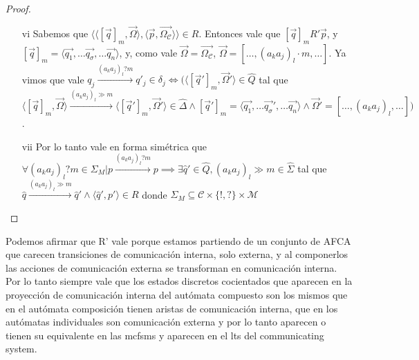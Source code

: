 \begin{proof}
\begin{itemize}
    \item[vi]  Sabemos que $\langle \langle [\overrightarrow{q}]_m, \overrightarrow{\Omega} \rangle, \langle \overrightarrow{p}, \overrightarrow{\Omega_\mathcal{C}} \rangle \rangle \in R$. Entonces vale que $[\overrightarrow{q}]_mR'\overrightarrow{p}$, y $[\overrightarrow{q}]_m = \langle \overrightarrow{q_1}, \ldots \overrightarrow{q_\sigma}, \ldots \overrightarrow{q_n} \rangle$, y, como vale $\overrightarrow{\Omega}=\overrightarrow{\Omega_\mathcal{C}}$, $\overrightarrow{\Omega} = [\ldots, (a_ka_j)_l \cdot m, \ldots]$. Ya vimos que vale $q_j \xrightarrow{(a_ka_j)_l?m} q'_j \in \delta_j  \iff  (\langle [\overrightarrow{q}']_m, \overrightarrow{\Omega}' \rangle \in \hat{Q}$ tal que $\langle [\overrightarrow{q}]_m, \overrightarrow{\Omega} \rangle \xrightarrow{(a_ka_j)_l \gg m} \langle [\overrightarrow{q}']_m, \overrightarrow{\Omega}' \rangle \in \hat{\Delta} \land [\overrightarrow{q}']_m= \langle \overrightarrow{q_1}, \ldots \overrightarrow{q_\sigma}', \ldots \overrightarrow{q_n} \rangle \land \overrightarrow{\Omega}'= [\ldots, (a_ka_j)_l, \ldots])$.
    
    \item[vii] Por lo tanto vale en forma simétrica que $\forall (a_ka_j)_l?m \in \Sigma_M | p \xrightarrow{(a_ka_j)_l?m} p \implies \exists \hat{q}' \in \hat{Q}, (a_ka_j)_l \gg m \in \hat{\Sigma}$ tal que $\hat{q} \xrightarrow{(a_ka_j)_l \gg m} \hat{q}' \land \langle \hat{q}', p'\rangle \in R$ donde $\Sigma_M \subseteq \mathcal{C} \times \{!,?\} \times \mathcal{M}$
    
\end{itemize}
\end{proof}

Podemos afirmar que R' vale porque estamos partiendo de un conjunto de AFCA que carecen transiciones de comunicación interna, solo externa, y al componerlos las acciones de comunicación externa se transforman en comunicación interna. Por lo tanto siempre vale que los estados discretos cocientados que aparecen en la proyección de comunicación interna del autómata compuesto son los mismos que en el autómata composición tienen aristas de comunicación interna, que en los autómatas individuales son comunicación externa y por lo tanto aparecen o tienen su equivalente en las mcfsms y aparecen en el lts del communicating system.


